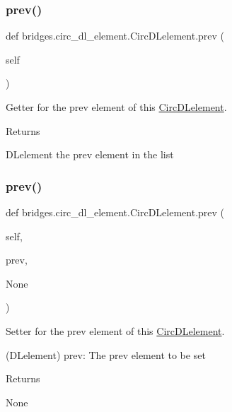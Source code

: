 \subsubsection{\texorpdfstring{prev()}{prev()}\hspace{0.1cm}{\footnotesize\ttfamily [1/2]}}
{\footnotesize\ttfamily def bridges.\+circ\+\_\+dl\+\_\+element.\+Circ\+D\+Lelement.\+prev (\begin{DoxyParamCaption}\item[{}]{self }\end{DoxyParamCaption})}



Getter for the prev element of this \hyperlink{classbridges_1_1circ__dl__element_1_1_circ_d_lelement}{Circ\+D\+Lelement}. 

\begin{DoxyReturn}{Returns}


D\+Lelement the prev element in the list 
\end{DoxyReturn}
\mbox{\label{classbridges_1_1circ__dl__element_1_1_circ_d_lelement_a5b62548af44a610a2230258fe641d8a2}} 
\subsubsection{\texorpdfstring{prev()}{prev()}\hspace{0.1cm}{\footnotesize\ttfamily [2/2]}}
{\footnotesize\ttfamily def bridges.\+circ\+\_\+dl\+\_\+element.\+Circ\+D\+Lelement.\+prev (\begin{DoxyParamCaption}\item[{}]{self,  }\item[{}]{prev,  }\item[{}]{None }\end{DoxyParamCaption})}



Setter for the prev element of this \hyperlink{classbridges_1_1circ__dl__element_1_1_circ_d_lelement}{Circ\+D\+Lelement}. 

(D\+Lelement) prev\+: The prev element to be set \begin{DoxyReturn}{Returns}


None 
\end{DoxyReturn}


